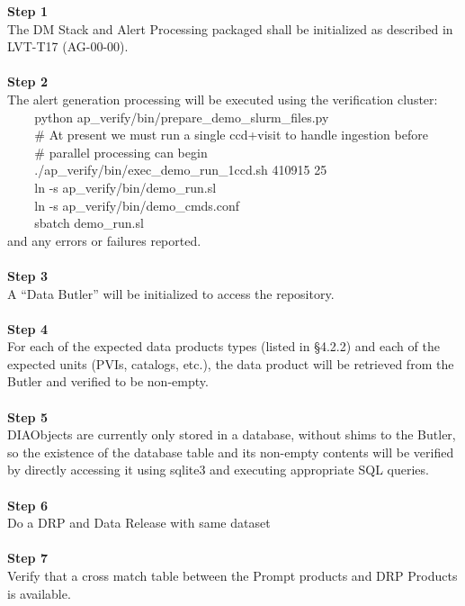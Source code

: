 \textbf{Step 1}\\
The DM Stack and Alert Processing packaged shall be initialized as
described in LVT-T17 (AG-00-00).\\
~\\
\textbf{Step 2}\\
The alert generation processing will be executed using the verification
cluster:\\
\hspace*{0.333em} ~ ~ ~python
ap\_verify/bin/prepare\_demo\_slurm\_files.py\\
\hspace*{0.333em} ~ ~ ~\# At present we must run a single ccd+visit to
handle ingestion before\\
\hspace*{0.333em} ~ ~ ~\# parallel processing can begin\\
\hspace*{0.333em} ~ ~ ~./ap\_verify/bin/exec\_demo\_run\_1ccd.sh 410915
25\\
\hspace*{0.333em} ~ ~ ~ln -s ap\_verify/bin/demo\_run.sl\\
\hspace*{0.333em} ~ ~ ~ln -s ap\_verify/bin/demo\_cmds.conf\\
\hspace*{0.333em} ~ ~ ~sbatch demo\_run.sl\\
and any errors or failures reported.\\
~\\
\textbf{Step 3}\\
A ``Data Butler'' will be initialized to access the repository.\\
~\\
\textbf{Step 4}\\
For each of the expected data products types (listed in §4.2.2) and each
of the expected units (PVIs, catalogs, etc.), the data product will be
retrieved from the Butler and verified to be non-empty.\\
~\\
\textbf{Step 5}\\
DIAObjects are currently only stored in a database, without shims to the
Butler, so the existence of the database table and its non-empty
contents will be verified by directly accessing it using sqlite3 and
executing appropriate SQL queries.\\
~\\
\textbf{Step 6}\\
Do a DRP and Data Release with same dataset\\
~\\
\textbf{Step 7}\\
Verify that a cross match table between the Prompt products and DRP
Products is available.\\
~\\


